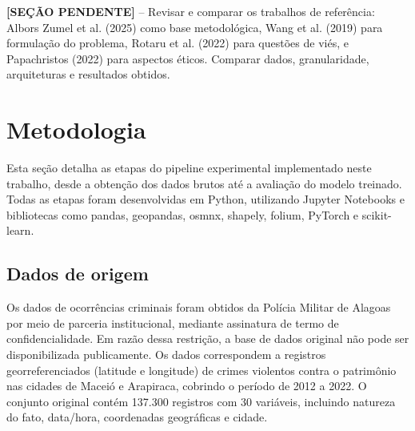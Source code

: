 %
%
%
%
%

\textbf{[SEÇÃO PENDENTE]} -- Revisar e comparar os trabalhos de referência: Albors Zumel et al. (2025) como base metodológica, Wang et al. (2019) para formulação do problema, Rotaru et al. (2022) para questões de viés, e Papachristos (2022) para aspectos éticos. Comparar dados, granularidade, arquiteturas e resultados obtidos.


\section{Metodologia}
\label{Sec:metodologia}

Esta seção detalha as etapas do pipeline experimental implementado neste trabalho, desde a obtenção dos dados brutos até a avaliação do modelo treinado. Todas as etapas foram desenvolvidas em Python, utilizando Jupyter Notebooks e bibliotecas como pandas, geopandas, osmnx, shapely, folium, PyTorch e scikit-learn.

\subsection{Dados de origem}
\label{Sec:dados}

Os dados de ocorrências criminais foram obtidos da Polícia Militar de Alagoas por meio de parceria institucional, mediante assinatura de termo de confidencialidade. Em razão dessa restrição, a base de dados original não pode ser disponibilizada publicamente. Os dados correspondem a registros georreferenciados (latitude e longitude) de crimes violentos contra o patrimônio nas cidades de Maceió e Arapiraca, cobrindo o período de 2012 a 2022. O conjunto original contém 137.300 registros com 30 variáveis, incluindo natureza do fato, data/hora, coordenadas geográficas e cidade.

